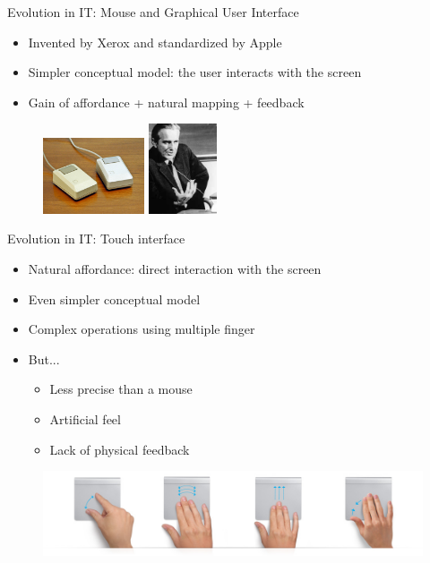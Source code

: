 \documentclass{beamer}
\begin{document}
\begin{frame}{Evolution in IT: Mouse and Graphical User Interface}
\begin{itemize}
\item Invented by Xerox and standardized by Apple
\item Simpler conceptual model: the user interacts with the screen
\item Gain of affordance + natural mapping + feedback
\end{itemize}

\begin{figure}
\raggedleft
	   \begin{minipage}{5cm}
				  \includegraphics[width=3cm]{mice.jpg}
			  \end{minipage}
			  	   \begin{minipage}{5cm}
				  \includegraphics[width=2cm]{doug.jpg}
			  \end{minipage}
\end{figure}
\end{frame}

\begin{frame}{Evolution in IT: Touch interface}
\begin{itemize}
\item Natural affordance: direct interaction with the screen
\item Even simpler conceptual model
\item Complex operations using multiple finger
\item But...
    \begin{itemize}
        \item Less precise than a mouse
        \item Artificial feel
        \item Lack of physical feedback
    \end{itemize}
\end{itemize}
\begin{figure}[ht]
\includegraphics[scale=0.3]{multitouch_gestures_trackpad_2.jpg}
\end{figure}
\end{frame}
\end{document}
